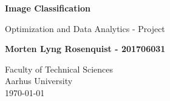 \begin{titlepage}
    \begin{center}
        \vspace*{1cm}
            
        \Huge
        \textbf{Image Classification}
            
        \vspace{0.5cm}
        \LARGE
        Optimization and Data Analytics - Project
            
        \vspace{1.5cm}
            
        \textbf{Morten Lyng Rosenquist - 201706031}
            
        \vfill
            
        \vspace{0.8cm}
            

            
        \Large
        Faculty of Technical Sciences\\
        Aarhus University\\
        \today
            
    \end{center}
\end{titlepage}